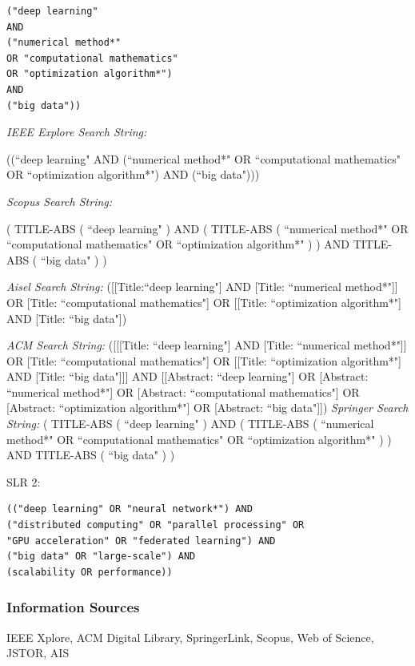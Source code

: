 \documentclass[a4paper,12pt]{article}
\begin{document}
\begin{verbatim}
("deep learning"
AND
("numerical method*"
OR "computational mathematics"
OR "optimization algorithm*")
AND
("big data"))
\end{verbatim}


\emph{IEEE Explore Search String:}

((``deep learning" AND (``numerical method*" OR ``computational mathematics" OR ``optimization algorithm*") AND (``big data")))

\emph{Scopus Search String:}

( TITLE-ABS ( ``deep learning" ) AND ( TITLE-ABS ( ``numerical method*" OR ``computational mathematics" OR ``optimization algorithm*" ) ) AND TITLE-ABS ( ``big data" ) )

\emph{Aisel Search String:}
([[Title:``deep learning"] AND [Title: ``numerical method*"]] OR [Title: ``computational mathematics"] OR [[Title: ``optimization algorithm*"] AND [Title: ``big data"])

\emph{ACM Search String:}
([[[Title: ``deep learning"] AND [Title: ``numerical method*"]] OR [Title: ``computational mathematics"] OR [[Title: ``optimization algorithm*"] AND [Title: ``big data"]]] AND [[Abstract: ``deep learning"] OR [Abstract: ``numerical method*"] OR [Abstract: ``computational mathematics"] OR [Abstract: ``optimization algorithm*"] OR [Abstract: ``big data"]])
\emph{Springer Search String:}
( TITLE-ABS ( ``deep learning" ) AND ( TITLE-ABS ( ``numerical method*" OR ``computational mathematics" OR ``optimization algorithm*" ) ) AND TITLE-ABS ( ``big data" ) )

\vline

SLR 2:
\begin{verbatim}
(("deep learning" OR "neural network*") AND
("distributed computing" OR "parallel processing" OR
"GPU acceleration" OR "federated learning") AND
("big data" OR "large-scale") AND
(scalability OR performance))
\end{verbatim}

\subsubsection{Information Sources}
IEEE Xplore, ACM Digital Library, SpringerLink, Scopus, Web of Science, JSTOR, AIS
\end{document}
